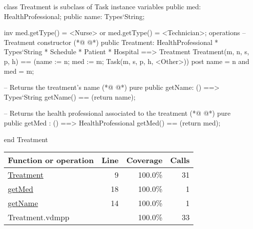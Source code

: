 \begin{vdmpp}[breaklines=true]
class Treatment is subclass of Task
instance variables
  public med: HealthProfessional;
  public name: Types`String;
  
  inv med.getType() = <Nurse> or med.getType() = <Technician>;
operations
 -- Treatment constructor
(*@
\label{Treatment:9}
@*)
 public Treatment: HealthProfessional * Types`String * Schedule * Patient * Hospital ==> Treatment
  Treatment(m, n, s, p, h) == (name := n; med := m; Task(m, s, p, h, <Other>))
 post name = n and med = m;
 
 -- Returns the treatment's name
(*@
\label{getName:14}
@*)
 pure public getName: () ==> Types`String
  getName() == (return name);
 
 -- Returns the health professional associated to the treatment
(*@
\label{getMed:18}
@*)
 pure public getMed : () ==> HealthProfessional
  getMed() == (return med);

end Treatment
\end{vdmpp}
\bigskip
\begin{longtable}{|l|r|r|r|}
\hline
Function or operation & Line & Coverage & Calls \\
\hline
\hline
\hyperref[Treatment:9]{Treatment} & 9&100.0\% & 31 \\
\hline
\hyperref[getMed:18]{getMed} & 18&100.0\% & 1 \\
\hline
\hyperref[getName:14]{getName} & 14&100.0\% & 1 \\
\hline
\hline
Treatment.vdmpp & & 100.0\% & 33 \\
\hline
\end{longtable}

